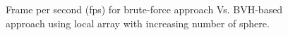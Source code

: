 \documentclass[a4paper,10pt]{article}
\begin{document}
\begin{figure}[tbh]
 \centering     
       
     \caption{Frame per second (fps) for brute-force approach Vs. BVH-based approach using local array with increasing number of sphere.}
   \label{fig:loc_arr}
\end{figure}

\medskip


\end{document}
